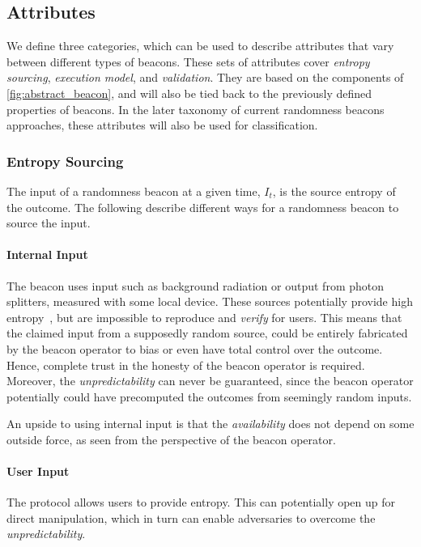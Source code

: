 \subsection{Attributes}
We define three categories, which can be used to describe attributes that vary between different types of beacons.
These sets of attributes cover \emph{entropy sourcing}, \emph{execution model}, and \emph{validation}.
They are based on the components of \cref{fig:abstract_beacon}, and will also be tied back to the previously defined properties of beacons.
In the later taxonomy of current randomness beacons approaches, these attributes will also be used for classification.

\subsubsection{Entropy Sourcing}
The input of a randomness beacon at a given time, $I_t$, is the source entropy of the outcome.
The following describe different ways for a randomness beacon to source the input.

\paragraph{Internal Input}
The beacon uses input such as background radiation or output from photon splitters, measured with some local device.
These sources potentially provide high entropy~\cite{nistbeacon}, but are impossible to reproduce and \emph{verify} for users.
This means that the claimed input from a supposedly random source, could be entirely fabricated by the beacon operator to bias or even have total control over the outcome.
Hence, complete trust in the honesty of the beacon operator is required.
Moreover, the \emph{unpredictability} can never be guaranteed, since the beacon operator potentially could have precomputed the outcomes from seemingly random inputs.

An upside to using internal input is that the \emph{availability} does not depend on some outside force, as seen from the perspective of the beacon operator.

\paragraph{User Input}
The protocol allows users to provide entropy.
This can potentially open up for direct manipulation, which in turn can enable adversaries to overcome the \emph{unpredictability}.

